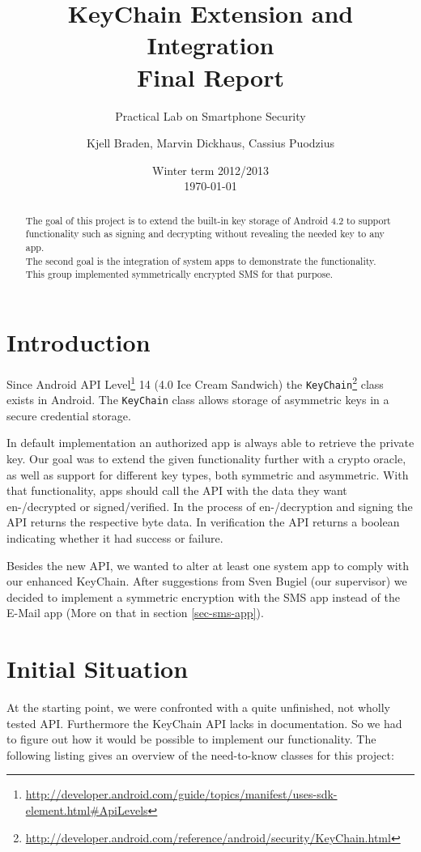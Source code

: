 \documentclass[a4paper]{scrartcl}
\title{KeyChain Extension and Integration\\
	Final Report}
\subtitle{Practical Lab on Smartphone Security}
\author{Kjell Braden, Marvin Dickhaus, Cassius Puodzius}
\date{Winter term 2012/2013\\\today}
\begin{document}
\maketitle

\begin{abstract}
	The goal of this project is to extend the built-in key storage of Android 4.2 to support functionality such as signing and decrypting without revealing the needed key to any app.\\
	The second goal is the integration of system apps to demonstrate the functionality. This group implemented symmetrically encrypted SMS for that purpose.
\end{abstract}

\tableofcontents


\section{Introduction}
	Since Android API Level\footnote{\url{http://developer.android.com/guide/topics/manifest/uses-sdk-element.html\#ApiLevels}} 14 (4.0 Ice Cream Sandwich) the \texttt{KeyChain}\footnote{\url{http://developer.android.com/reference/android/security/KeyChain.html}} class exists in Android. The \texttt{KeyChain} class allows storage of asymmetric keys in a secure credential storage.

	In default implementation an authorized app is always able to retrieve the private key. Our goal was to extend the given functionality further with a crypto oracle, as well as support for different key types, both symmetric and asymmetric. With that functionality, apps should call the API with the data they want en-/decrypted or signed/verified. In the process of en-/decryption and signing the API returns the respective byte data. In verification the API returns a boolean indicating whether it had success or failure.
	
	Besides the new API, we wanted to alter at least one system app to comply with our enhanced KeyChain. After suggestions from Sven Bugiel (our supervisor) we decided to implement a symmetric encryption with the SMS app instead of the E-Mail app (More on that in section \ref{sec-sms-app}).

\section{Initial Situation}
	At the starting point, we were confronted with a quite unfinished, not wholly tested API. Furthermore the KeyChain API lacks in documentation. So we had to figure out how it would be possible to implement our functionality. The following listing gives an overview of the need-to-know classes for this project:
	
\end{document}

